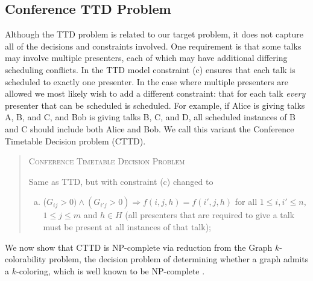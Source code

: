\documentclass{svjour3}                     %
\begin{document}
\subsection{Conference TTD Problem}
Although the TTD problem is related to our target problem, it does not capture all of the decisions and constraints involved.
One requirement is that some talks may involve multiple presenters, each of which may have additional differing scheduling conflicts.
In the TTD model constraint (c) ensures that each talk is scheduled to exactly one presenter. 
In the case where multiple presenters are allowed we most likely wish to add a different constraint: that for each talk \emph{every} presenter that can be scheduled is scheduled. 
For example, if Alice is giving talks A, B, and C, and Bob is giving talks B, C, and D, all scheduled instances of B and C should include both Alice and Bob. 
We call this variant the Conference Timetable Decision problem (CTTD).
\begin{quote}
	\textsc{Conference Timetable Decision Problem}
	
	Same as TTD, but with constraint (c) changed to
	\begin{enumerate}[(c)]
		\item ($G_{ij} > 0) \land (G_{i'j} > 0) \Rightarrow f(i,j,h)=f(i',j,h)$ for all $1 \le i,i' \le n$, $1 \le j \le m$ and $h \in H$ (all presenters that are required to give a talk must be present at all instances of that talk);
	\end{enumerate}
\end{quote}

We now show that CTTD is NP-complete via reduction from the Graph $k$-colorability problem, the decision problem of determining whether a graph admits a $k$-coloring, which is well known to be NP-complete \cite{garey76_2}.
\end{document}
